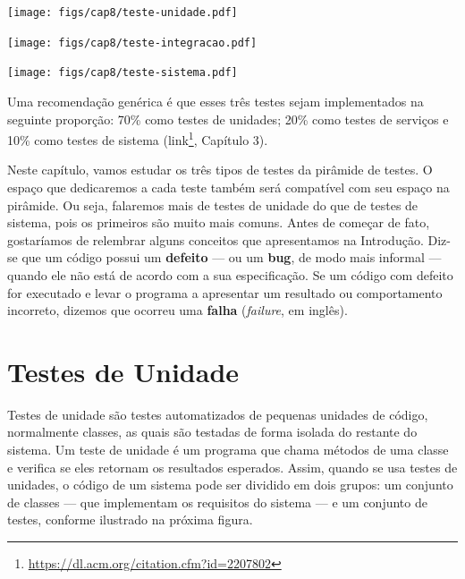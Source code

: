 \documentclass[
  11pt,
  twoside]{book}
\DeclareRobustCommand{\href}[2]{#2\footnote{\url{#1}}}
\let\origfigure\figure
\let\endorigfigure\endfigure
\renewenvironment{figure}[1][2] {
    \expandafter\origfigure\expandafter[!h]
} {
    \endorigfigure
}
\begin{document}
\begin{figure}
\centering
\texttt{[image: figs/cap8/teste-unidade.pdf]}
\caption{Escopo de testes de unidade}
\end{figure}

\begin{figure}
\centering
\texttt{[image: figs/cap8/teste-integracao.pdf]}
\caption{Escopo de testes de integração}
\end{figure}

\begin{figure}
\centering
\texttt{[image: figs/cap8/teste-sistema.pdf]}
\caption{Escopo de testes de sistema}
\end{figure}

Uma recomendação genérica é que esses três testes sejam implementados na
seguinte proporção: 70\% como testes de unidades; 20\% como testes de
serviços e 10\% como testes de sistema
(\href{https://dl.acm.org/citation.cfm?id=2207802}{link}, Capítulo 3).

Neste capítulo, vamos estudar os três tipos de testes da pirâmide de
testes. O espaço que dedicaremos a cada teste também será compatível com
seu espaço na pirâmide. Ou seja, falaremos mais de testes de unidade do
que de testes de sistema, pois os primeiros são muito mais comuns. Antes
de começar de fato, gostaríamos de relembrar alguns conceitos que
apresentamos na Introdução. Diz-se que um código possui um
\textbf{defeito} --- ou um \textbf{bug}, de modo mais informal ---
quando ele não está de acordo com a sua especificação. Se um código com
defeito for executado e levar o programa a apresentar um resultado ou
comportamento incorreto, dizemos que ocorreu uma \textbf{falha}
(\emph{failure}, em inglês).

\hypertarget{testes-de-unidade}{%
\section{Testes de Unidade}\label{testes-de-unidade}}

 

Testes de unidade são testes automatizados de pequenas unidades de
código, normalmente classes, as quais são testadas de forma isolada do
restante do sistema. Um teste de unidade é um programa que chama métodos
de uma classe e verifica se eles retornam os resultados esperados.
Assim, quando se usa testes de unidades, o código de um sistema pode ser
dividido em dois grupos: um conjunto de classes --- que implementam os
requisitos do sistema --- e um conjunto de testes, conforme ilustrado na
próxima figura.
\end{document}

